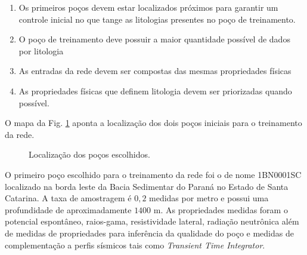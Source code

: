 \begin{enumerate}
	\item Os primeiros poços devem estar localizados próximos para garantir um controle inicial no que tange as litologias presentes no poço de treinamento. 
	\item O poço de treinamento deve possuir a maior quantidade possível de dados por litologia
	\item As entradas da rede devem ser compostas das mesmas propriedades físicas
	\item As propriedades físicas que definem litologia devem ser priorizadas quando possível.
\end{enumerate}

O mapa da Fig. \ref{loc02} aponta a localização dos dois poços iniciais para o treinamento da rede.  


\begin{figure}[H]
	\flushleft
	\setlength{\fboxsep}{8pt}
	\setlength{\fboxrule}{0.1pt}
	\caption{Localização dos poços escolhidos.}
	\label{loc02}
\end{figure}

O primeiro poço escolhido para o treinamento da rede foi o de nome 1BN0001SC localizado na borda leste da Bacia Sedimentar do Paraná no Estado de Santa Catarina. A taxa de amostragem é $0,2$ medidas por metro e possui uma profundidade de aproximadamente $1400$ m.  As propriedades medidas foram o potencial espontâneo, raios-gama, resistividade lateral, radiação neutrônica além de medidas de propriedades para inferência da qualidade do poço e medidas de complementação a perfis sísmicos tais como \textit{Transient Time Integrator}.  

